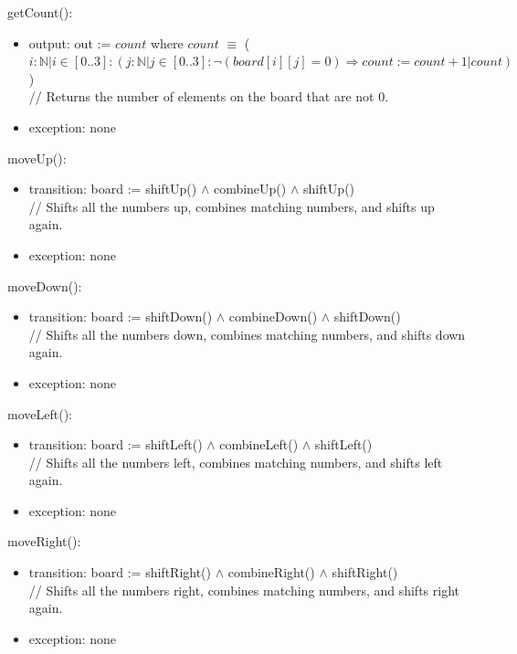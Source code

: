 \documentclass[12pt]{article}
\begin{document}
\noindent getCount():
\begin{itemize}
    \item output: out := $count$ where $count$ $\equiv$ ($i : \mathbb{N} \vert i
    \in [0..3]: (j : \mathbb{N} \vert j \in [0..3]: \lnot (board[i][j] = 0)
    \Rightarrow count := count + 1 \vert count) $) \\
    // Returns the number of elements on the board that are not 0.
    \item exception: none
\end{itemize}

\noindent moveUp():
\begin{itemize}
    \item transition: board := shiftUp() $\land$ combineUp()
    $\land$ shiftUp()\\
    // Shifts all the numbers up, combines matching numbers, and shifts up again.
    \item exception: none
\end{itemize}

\noindent moveDown():
\begin{itemize}
    \item transition: board := shiftDown() $\land$ combineDown()
    $\land$ shiftDown()\\
    // Shifts all the numbers down, combines matching numbers, and shifts down again.
    \item exception: none
\end{itemize}

\noindent moveLeft():
\begin{itemize}
    \item transition: board := shiftLeft() $\land$ combineLeft()
    $\land$ shiftLeft()\\
    // Shifts all the numbers left, combines matching numbers, and shifts left again.
    \item exception: none
\end{itemize}

\noindent moveRight():
\begin{itemize}
    \item transition: board := shiftRight() $\land$ combineRight()
    $\land$ shiftRight()\\
    // Shifts all the numbers right, combines matching numbers, and shifts right again.
    \item exception: none
\end{itemize}
\end{document}
